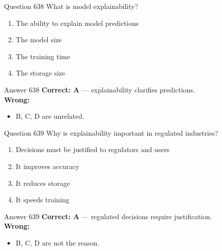 \documentclass[aspectratio=169,11pt]{beamer}
\begin{document}
	\begin{frame}{Question 638}
		What is model explainability?
		\begin{enumerate}[label=\Alph*.]
			\item The ability to explain model predictions
			\item The model size
			\item The training time
			\item The storage size
		\end{enumerate}
	\end{frame}
	\begin{frame}{Answer 638}
		\textbf{Correct: A} --- explainability clarifies predictions.\\
		\vspace{0.5em}
		\textbf{Wrong:}
		\begin{itemize}
			\item B, C, D are unrelated.
		\end{itemize}
	\end{frame}
	
	\begin{frame}{Question 639}
		Why is explainability important in regulated industries?
		\begin{enumerate}[label=\Alph*.]
			\item Decisions must be justified to regulators and users
			\item It improves accuracy
			\item It reduces storage
			\item It speeds training
		\end{enumerate}
	\end{frame}
	\begin{frame}{Answer 639}
		\textbf{Correct: A} --- regulated decisions require justification.\\
		\vspace{0.5em}
		\textbf{Wrong:}
		\begin{itemize}
			\item B, C, D are not the reason.
		\end{itemize}
	\end{frame}
	
\end{document}
